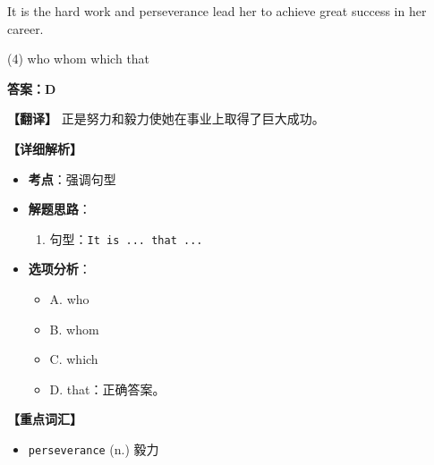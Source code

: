 \documentclass[11pt, a4paper]{article}
\newcommand{\analysis}[4]{
    \begin{solutionbox}
        \textbf{答案：#1}
        
        \textbf{【翻译】} #2
        
        \textbf{【详细解析】}
        #3
        
        \textbf{【重点词汇】}
        #4
    \end{solutionbox}
}
\newcommand{\blank}{\underline{\hspace{1.5cm}}}
\begin{document}
\begin{questions}
    \item It is the hard work and perseverance \blank lead her to achieve great success in her career.
    \begin{tasks}(4)
        \task who \task whom \task which \task that
    \end{tasks}
    \analysis{D}{正是努力和毅力使她在事业上取得了巨大成功。}{
        \begin{itemize}
            \item \textbf{考点}：强调句型
            \item \textbf{解题思路}：
                \begin{enumerate}
                    \item 句型：\texttt{It is ... that ...}
                \end{enumerate}
            \item \textbf{选项分析}：
                \begin{itemize}
                    \item A. who
                    \item B. whom
                    \item C. which
                    \item D. that：正确答案。
                \end{itemize}
        \end{itemize}
    }{
        \begin{itemize}
            \item \texttt{perseverance} (n.) 毅力
        \end{itemize}
    }


\end{questions}
\end{document}
